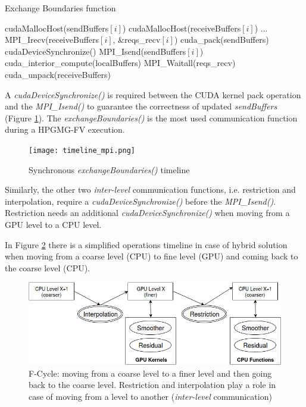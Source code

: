 \documentclass[review]{siamart1116}
\begin{document}
\begin{algorithm}
\small
\caption{Exchange Boundaries function}
\label{algo:exchange_boundaries}
\begin{algorithmic}[1]
\State cudaMallocHost(sendBuffers$[i]$)
\State cudaMallocHost(receiveBuffers$[i]$)
\EndFor
\State ...
 \label{alg:b}
                \State MPI\_Irecv(receiveBuffers$[i]$, \&reqs\_recv$[i]$)
        \EndFor
        \State cuda\_pack(sendBuffers)
        \State cudaDeviceSynchronize()
                \State MPI\_Isend(sendBuffers$[i]$)
        \EndFor
        \State cuda\_interior\_compute(localBuffers)
        \State MPI\_Waitall(reqs\_recv)
        \State cuda\_unpack(receiveBuffers)
\EndFunction
\end{algorithmic}
\end{algorithm}

A \textit{cudaDeviceSynchronize()} is required between the CUDA kernel
pack operation and the \textit{MPI\_Isend()} to guarantee the correctness
of updated \textit{sendBuffers} (Figure \ref{fig:timeline_mpi}).
The \textit{exchangeBoundaries()} is the most used communication function during a HPGMG-FV execution.

\begin{figure}[h]
\centering
\texttt{[image: timeline\_mpi.png]}
\caption{Synchronous \textit{exchangeBoundaries()} timeline}
\label{fig:timeline_mpi}
\end{figure}

Similarly, the other two \emph{inter-level} communication functions, i.e. restriction and interpolation, require a \textit{cudaDeviceSynchronize()} before the \textit{MPI\_Isend()}. Restriction needs an additional \textit{cudaDeviceSynchronize()} when moving from a GPU level to a CPU level.

In Figure \ref{fig:hpgmg_levels} there is a simplified operations timeline in case of hybrid solution when moving from a coarse level (CPU) to fine level (GPU) and coming back to the coarse level (CPU).

\begin{figure}[h]
\centering
\includegraphics[scale=0.4]{hpgmg_levels.png}
\caption{F-Cycle: moving from a coarse level to a finer level and then going back to the coarse level. Restriction and interpolation play a role in case of moving from a level to another (\emph{inter-level} communication)}
\label{fig:hpgmg_levels}
\end{figure}
\end{document}
